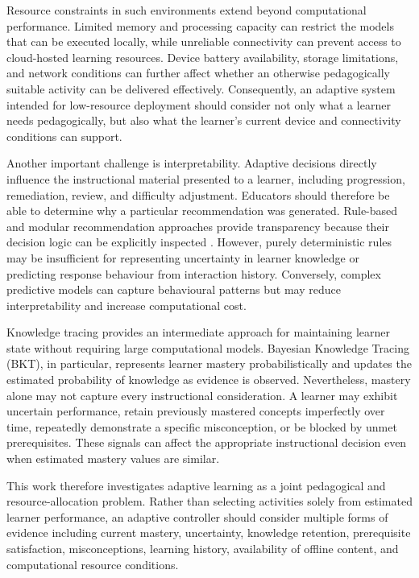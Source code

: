 \documentclass[conference]{IEEEtran}
\begin{document}
Resource constraints in such environments extend beyond computational performance. Limited memory and processing capacity can restrict the models that can be executed locally, while unreliable connectivity can prevent access to cloud-hosted learning resources. Device battery availability, storage limitations, and network conditions can further affect whether an otherwise pedagogically suitable activity can be delivered effectively. Consequently, an adaptive system intended for low-resource deployment should consider not only what a learner needs pedagogically, but also what the learner's current device and connectivity conditions can support.

Another important challenge is interpretability. Adaptive decisions directly influence the instructional material presented to a learner, including progression, remediation, review, and difficulty adjustment. Educators should therefore be able to determine why a particular recommendation was generated. Rule-based and modular recommendation approaches provide transparency because their decision logic can be explicitly inspected \cite{pelanek2024rules}. However, purely deterministic rules may be insufficient for representing uncertainty in learner knowledge or predicting response behaviour from interaction history. Conversely, complex predictive models can capture behavioural patterns but may reduce interpretability and increase computational cost.

Knowledge tracing provides an intermediate approach for maintaining learner state without requiring large computational models. Bayesian Knowledge Tracing (BKT), in particular, represents learner mastery probabilistically and updates the estimated probability of knowledge as evidence is observed. Nevertheless, mastery alone may not capture every instructional consideration. A learner may exhibit uncertain performance, retain previously mastered concepts imperfectly over time, repeatedly demonstrate a specific misconception, or be blocked by unmet prerequisites. These signals can affect the appropriate instructional decision even when estimated mastery values are similar.

This work therefore investigates adaptive learning as a joint pedagogical and resource-allocation problem. Rather than selecting activities solely from estimated learner performance, an adaptive controller should consider multiple forms of evidence including current mastery, uncertainty, knowledge retention, prerequisite satisfaction, misconceptions, learning history, availability of offline content, and computational resource conditions.
\end{document}
